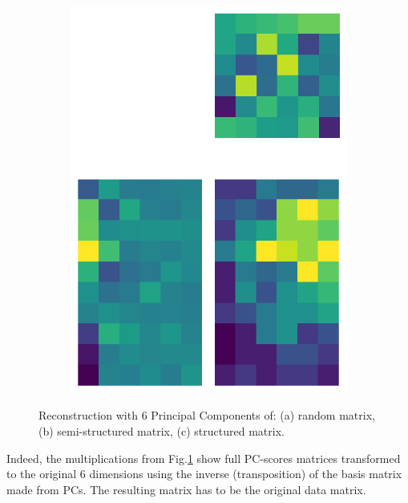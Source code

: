 \documentclass[10pt,twocolumn]{article}
\begin{document}
\begin{figure}[H]
\begin{subfigure}[t]{.15\textwidth}
\includegraphics[scale=.2]{DWGs/structured-matrix-reconstruction-PCs-6.png}
\caption{ }
\end{subfigure}
\caption{Reconstruction with 6 Principal Components of: (a) random matrix, (b) semi-structured matrix, (c) structured matrix.}
\label{fig:matrices-reconstruction-6}
\end{figure}

Indeed, the multiplications from Fig.\ref{fig:matrices-reconstruction-6} show full PC-scores matrices transformed to the original 6 dimensions using the inverse (transposition) of the basis matrix made from PCs. The resulting matrix has to be the original data matrix.



\appendix



\end{document}
